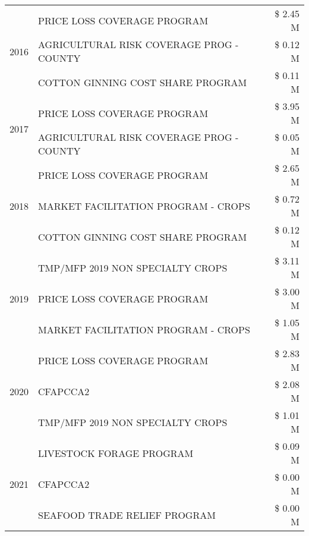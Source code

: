 \begin{tabular}{llr}
\cline{1-3}
\multirow[t]{3}{*}{2016} & PRICE LOSS COVERAGE PROGRAM & \$ 2.45 M \\
 & AGRICULTURAL RISK COVERAGE PROG - COUNTY & \$ 0.12 M \\
 & COTTON GINNING COST SHARE PROGRAM & \$ 0.11 M \\
\cline{1-3}
\multirow[t]{2}{*}{2017} & PRICE LOSS COVERAGE PROGRAM & \$ 3.95 M \\
 & AGRICULTURAL RISK COVERAGE PROG - COUNTY & \$ 0.05 M \\
\cline{1-3}
\multirow[t]{3}{*}{2018} & PRICE LOSS COVERAGE PROGRAM & \$ 2.65 M \\
 & MARKET FACILITATION PROGRAM - CROPS & \$ 0.72 M \\
 & COTTON GINNING COST SHARE PROGRAM & \$ 0.12 M \\
\cline{1-3}
\multirow[t]{3}{*}{2019} & TMP/MFP 2019 NON SPECIALTY CROPS & \$ 3.11 M \\
 & PRICE LOSS COVERAGE PROGRAM & \$ 3.00 M \\
 & MARKET FACILITATION PROGRAM - CROPS & \$ 1.05 M \\
\cline{1-3}
\multirow[t]{3}{*}{2020} & PRICE LOSS COVERAGE PROGRAM & \$ 2.83 M \\
 & CFAPCCA2 & \$ 2.08 M \\
 & TMP/MFP 2019 NON SPECIALTY CROPS & \$ 1.01 M \\
\cline{1-3}
\multirow[t]{3}{*}{2021} & LIVESTOCK FORAGE PROGRAM & \$ 0.09 M \\
 & CFAPCCA2 & \$ 0.00 M \\
 & SEAFOOD TRADE RELIEF PROGRAM & \$ 0.00 M \\
\cline{1-3}
\bottomrule
\end{tabular}
